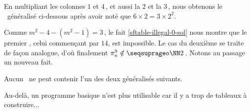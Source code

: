 En multipliant les colonnes $1$ et $4$\,, et aussi la $2$ et la $3$\,, nous obtenons le \sftab\ généralisé ci-dessous après avoir noté que $6 \times 2 = 3 \times 2^2$.

\begin{center}
\end{center}


Comme $m^2 - 4 - ( m^2 - 1 ) = 3$\,, le fait \ref{sftable-illegal-0-sol} nous montre que le premier \sftab[], celui commençant par $14$, est impossible.
Le cas du deuxième se traite de façon analogue, d'où finalement $\consprod<9> \notin \NNsquare$\,. Notons au passage un nouveau fait.


\begin{fact} \label{no-sftab-1.6.*.2.3}
	Aucun \sftab\ ne peut contenir l'un des deux \sftab[x] généralisés suivants.
	\begin{center}
	\end{center} 
\end{fact}




Au-delà, un programme basique n'est plus utilisable car il y a trop de tableaux à construire...

